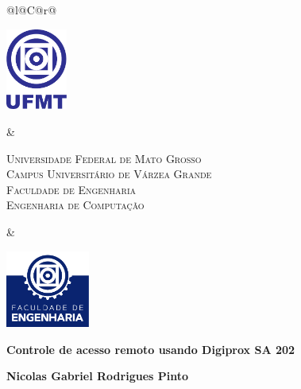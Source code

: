 %
%

\begin{titlepage}

\begin{center}

\small

\begin{tabularx}{\linewidth}{@{}l@{}C@{}r@{}}
\parbox[c]{2cm}{\includegraphics[width=2cm]{pre-textuais/figuras/ufmt}} &
\begin{center}
\textsf{\textsc{Universidade Federal de Mato Grosso\\
Campus Universitário de Várzea Grande\\
Faculdade de Engenharia\\
Engenharia de Computação}}
\end{center} &
\parbox[c]{2cm}{\includegraphics[width=2.75cm]{pre-textuais/figuras/faeng}}
\end{tabularx}

\vfill

\LARGE

\textbf{Controle de acesso  remoto usando Digiprox SA 202  }

\vfill

\Large

\textbf{Nicolas Gabriel Rodrigues Pinto}


\end{center}
\end{titlepage}
